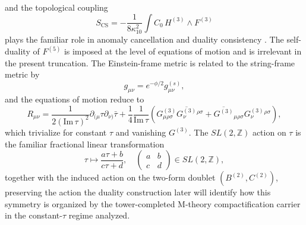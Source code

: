 \documentclass[11pt]{article}
\theoremstyle{remark}
\newcommand{\Z}{\mathbb{Z}}
\begin{document}
and the topological coupling
\begin{equation}
S_{\mathrm{CS}} = - \frac{1}{8 \kappa_{10}^2} \int C_0 \, H^{(3)} \wedge F^{(3)}
\end{equation}
plays the familiar role in anomaly cancellation and duality consistency \cite{Schwarz1995}. The self-duality of \(F^{(5)}\) is imposed at the level of equations of motion \cite{Schwarz1995} and is irrelevant in the present truncation. The Einstein-frame metric is related to the string-frame metric by
\begin{equation}
g_{\mu\nu} = e^{-\phi/2} g^{(s)}_{\mu\nu},
\end{equation}
and the equations of motion reduce to
\begin{equation}
R_{\mu\nu} = \frac{1}{2 (\mathrm{Im} \, \tau)^2} \partial_{(\mu} \tau \partial_{\nu)} \bar{\tau} + \frac{1}{4} \frac{1}{\mathrm{Im} \, \tau} \left( G^{(3)}_{\mu\rho\sigma} \overline{G^{(3)}_{\nu}}{}^{\rho\sigma} + \overline{G^{(3)}}_{\mu\rho\sigma} G^{(3)}_{\nu}{}^{\rho\sigma} \right),
\end{equation}
which trivialize for constant \(\tau\) and vanishing \(G^{(3)}\). The \(SL(2,\Z)\) action on \(\tau\) is the familiar fractional linear transformation
\begin{equation}
\tau \mapsto \frac{a \tau + b}{c \tau + d}, \quad \begin{pmatrix} a & b \\ c & d \end{pmatrix} \in SL(2,\Z),
\end{equation}
together with the induced action on the two-form doublet \((B^{(2)},C^{(2)})\), preserving the action \cite{Schwarz1995, Vafa1996}\; the duality construction later will identify how this symmetry is organized by the tower-completed M-theory compactification carrier in the constant-\(\tau\) regime analyzed.
\end{document}
